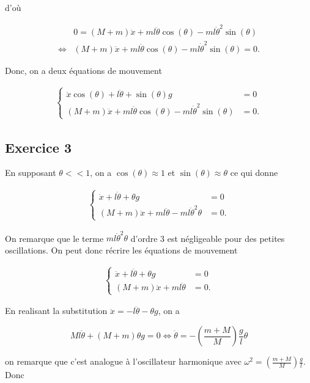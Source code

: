 \documentclass[french]{article}
\begin{document}
	d'où
	
	\begin{align}
	& 0 = (M+m)\ddot{x} + ml\ddot{\theta}\cos(\theta) - ml\dot{\theta}^2\sin(\theta)\\
	\iff &  (M+m)\ddot{x} + ml\ddot{\theta}\cos(\theta) - ml\dot{\theta}^2\sin(\theta) = 0.
	\end{align}
	
	Donc, on a deux équations de mouvement
	
	\begin{align}
		\begin{cases}
		\ddot{x} \cos(\theta) + l\ddot{\theta} + \sin(\theta)g &= 0\\
		(M+m)\ddot{x} + ml\ddot{\theta}\cos(\theta) - ml\dot{\theta}^2\sin(\theta) &= 0.
		\end{cases}
	\end{align}
	
	
	\subsection*{Exercice 3}
	
	En supposant $\theta << 1$, on a $\cos(\theta) \approx 1$ et $\sin(\theta) \approx \theta$ ce qui donne
	
	\begin{align}
	\begin{cases}
	\ddot{x} + l\ddot{\theta} + \theta g &= 0\\
	(M+m)\ddot{x} + ml\ddot{\theta} - ml\dot{\theta}^2\theta &= 0.
	\end{cases}
	\end{align}
	
	On remarque que le terme $ml\dot{\theta}^2\theta$ d'ordre 3 est négligeable pour des petites oscillations. On peut donc récrire les équations de mouvement
	
	\begin{align}
	\begin{cases}
	\ddot{x} + l\ddot{\theta} + \theta g &= 0\\
	(M+m)\ddot{x} + ml\ddot{\theta} &= 0.
	\end{cases}
	\end{align}
	
	En realisant la substitution $\ddot{x} = -l\ddot{\theta} -\theta g$, on a
	
	$$ Ml\ddot{\theta} + (M+m)\theta g  = 0 \iff \ddot{\theta} = -\left(\frac{m + M}{M}\right)\frac{g}{l}\theta$$
	
	on remarque que c'est analogue à l'oscillateur harmonique avec $\omega^2 = \left(\frac{m + M}{M}\right)\frac{g}{l}$. Donc
	
\end{document}
